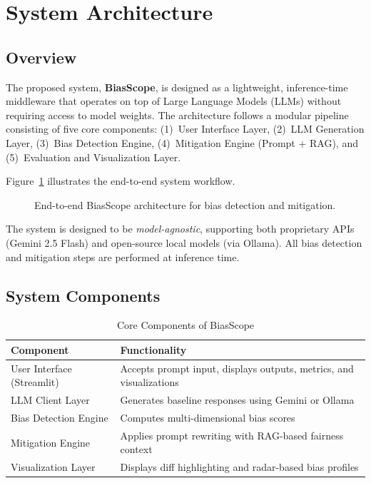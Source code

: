 \documentclass[conference]{IEEEtran}
\begin{document}
\section{System Architecture}

\subsection{Overview}

The proposed system, \textbf{BiasScope}, is designed as a lightweight, inference-time middleware that operates on top of Large Language Models (LLMs) without requiring access to model weights. The architecture follows a modular pipeline consisting of five core components: (1)~User Interface Layer, (2)~LLM Generation Layer, (3)~Bias Detection Engine, (4)~Mitigation Engine (Prompt + RAG), and (5)~Evaluation and Visualization Layer.

Figure~\ref{fig:arch} illustrates the end-to-end system workflow.

\begin{figure}[h]
\centering
{}
\caption{End-to-end BiasScope architecture for bias detection and mitigation.}
\label{fig:arch}
\end{figure}

The system is designed to be \textit{model-agnostic}, supporting both proprietary APIs (Gemini 2.5 Flash) and open-source local models (via Ollama). All bias detection and mitigation steps are performed at inference time.

\vspace{6pt}

\subsection{System Components}

\begin{table}[h]
\caption{Core Components of BiasScope}
\label{tab:components}
\centering
\begin{tabular}{p{3cm} p{4.8cm}}
\toprule
\textbf{Component} & \textbf{Functionality} \\
\midrule
User Interface (Streamlit) & Accepts prompt input, displays outputs, metrics, and visualizations \\
LLM Client Layer & Generates baseline responses using Gemini or Ollama \\
Bias Detection Engine & Computes multi-dimensional bias scores \\
Mitigation Engine & Applies prompt rewriting with RAG-based fairness context \\
Visualization Layer & Displays diff highlighting and radar-based bias profiles \\
\bottomrule
\end{tabular}
\end{table}
\end{document}
